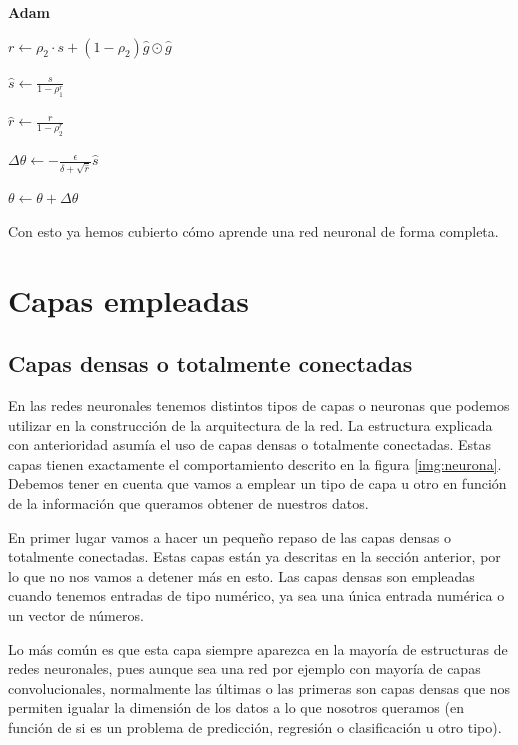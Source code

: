 \begin{itemize}
\begin{algorithm}[H]{\Large{\textbf{Adam}}}
{			$r\leftarrow \rho_2 \cdot s + (1-\rho_2)\hat{g}\odot \hat{g}$
			
			$\hat{s}\leftarrow \frac{s}{1-\rho_1^r}$
			
			$\hat{r}\leftarrow \frac{r}{1-\rho_2^r}$
			
			$\Delta \theta \leftarrow - \frac{\epsilon}{\delta + \sqrt{\hat{r}}}\hat{s}$
			
			$\theta \leftarrow \theta + \Delta \theta$
			
		}
		
		\vspace{10px}
		
		
		\vspace{5px}
	\end{algorithm}
\end{itemize}

Con esto ya hemos cubierto cómo aprende una red neuronal de forma completa.

\section{Capas empleadas}

\subsection{Capas densas o totalmente conectadas}

En las redes neuronales tenemos distintos tipos de capas o neuronas que podemos utilizar en la construcción de la arquitectura de la red. La estructura explicada con anterioridad asumía el uso de capas densas o totalmente conectadas. Estas capas tienen exactamente el comportamiento descrito en la figura \ref{img:neurona}. Debemos tener en cuenta que vamos a emplear un tipo de capa u otro en función de la información que queramos obtener de nuestros datos.

En primer lugar vamos a hacer un pequeño repaso de las capas densas o totalmente conectadas. Estas capas están ya descritas en la sección anterior, por lo que no nos vamos a detener más en esto. Las capas densas son empleadas cuando tenemos entradas de tipo numérico, ya sea una única entrada numérica o un vector de números. 

Lo más común es que esta capa siempre aparezca en la mayoría de estructuras de redes neuronales, pues aunque sea una red por ejemplo con mayoría de capas convolucionales, normalmente las últimas o las primeras son capas densas que nos permiten igualar la dimensión de los datos a lo que nosotros queramos (en función de si es un problema de predicción, regresión o clasificación u otro tipo).

